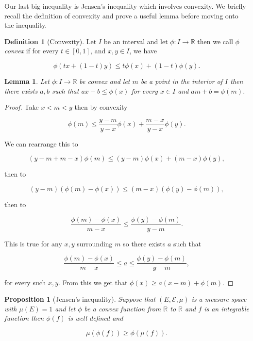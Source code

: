 \documentclass[
]{book}
\newtheorem{lemma}{Lemma}[chapter]
\newtheorem{proposition}{Proposition}[chapter]
\theoremstyle{definition}
\newtheorem{definition}{Definition}[chapter]
\theoremstyle{definition}
\theoremstyle{definition}
\theoremstyle{definition}
\theoremstyle{remark}
\begin{document}
Our last big inequality is Jensen's inequality which involves convexity. We briefly recall the definition of convexity and prove a useful lemma before moving onto the inequality.

\begin{definition}[Convexity]
Let \(I\) be an interval and let \(\phi: I \rightarrow \mathbb{R}\) then we call \(\phi\) \emph{convex} if for every \(t \in [0,1]\), and \(x,y \in I\), we have

\[\phi(tx +(1-t)y) \leq t\phi(x) + (1-t)\phi(y).\]
\end{definition}

\begin{lemma}
Let \(\phi: I \rightarrow \mathbb{R}\) be convex and let \(m\) be a point in the interior of \(I\) then there exists \(a,b\) such that \(ax+b \leq \phi(x)\) for every \(x \in I\) and \(am+b = \phi(m)\).
\end{lemma}

\begin{proof}
Take \(x<m<y\) then by convexity

\[ \phi(m) \leq \frac{y-m}{y-x} \phi(x) + \frac{m-x}{y-x} \phi(y). \]

We can rearrange this to

\[ (y-m + m-x) \phi(m) \leq (y-m) \phi(x) + (m-x) \phi(y), \]

then to

\[ (y-m)(\phi(m)-\phi(x)) \leq (m-x)(\phi(y)-\phi(m)), \]

then to

\[ \frac{\phi(m)-\phi(x)}{m-x} \leq \frac{\phi(y)-\phi(m)}{y-m}. \]

This is true for any \(x,y\) surrounding \(m\) so there exists \(a\) such that

\[  \frac{\phi(m)-\phi(x)}{m-x} \leq a \leq \frac{\phi(y)-\phi(m)}{y-m}, \]

for every such \(x,y\). From this we get that \(\phi(x) \geq a(x-m) + \phi(m)\).
\end{proof}

\begin{proposition}[Jensen's inequality]
Suppose that \((E, \mathcal{E}, \mu)\) is a measure space with \(\mu(E) = 1\) and let \(\phi\) be a convex function from \(\mathbb{R}\) to \(\mathbb{R}\) and \(f\) is an integrable function then \(\phi(f)\) is well defined and

\[ \mu(\phi(f)) \geq \phi(\mu(f)). \]
\end{proposition}
\end{document}
